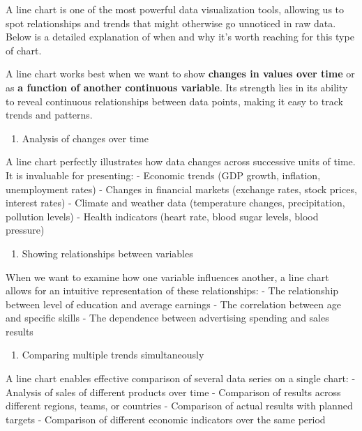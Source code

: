 \documentclass[
  english,
  letterpaper,
  DIV=11,
  numbers=noendperiod]{scrreprt}
\providecommand{\tightlist}{%
  \setlength{\itemsep}{0pt}\setlength{\parskip}{0pt}}
\begin{document}
A line chart is one of the most powerful data visualization tools,
allowing us to spot relationships and trends that might otherwise go
unnoticed in raw data. Below is a detailed explanation of when and why
it's worth reaching for this type of chart.

A line chart works best when we want to show \textbf{changes in values
over time} or as \textbf{a function of another continuous variable}. Its
strength lies in its ability to reveal continuous relationships between
data points, making it easy to track trends and patterns.

\begin{enumerate}
\def\labelenumi{\arabic{enumi}.}
\tightlist
\item
  Analysis of changes over time
\end{enumerate}

A line chart perfectly illustrates how data changes across successive
units of time. It is invaluable for presenting: - Economic trends (GDP
growth, inflation, unemployment rates) - Changes in financial markets
(exchange rates, stock prices, interest rates) - Climate and weather
data (temperature changes, precipitation, pollution levels) - Health
indicators (heart rate, blood sugar levels, blood pressure)

\begin{enumerate}
\def\labelenumi{\arabic{enumi}.}
\setcounter{enumi}{1}
\tightlist
\item
  Showing relationships between variables
\end{enumerate}

When we want to examine how one variable influences another, a line
chart allows for an intuitive representation of these relationships: -
The relationship between level of education and average earnings - The
correlation between age and specific skills - The dependence between
advertising spending and sales results

\begin{enumerate}
\def\labelenumi{\arabic{enumi}.}
\setcounter{enumi}{2}
\tightlist
\item
  Comparing multiple trends simultaneously
\end{enumerate}

A line chart enables effective comparison of several data series on a
single chart: - Analysis of sales of different products over time -
Comparison of results across different regions, teams, or countries -
Comparison of actual results with planned targets - Comparison of
different economic indicators over the same period
\end{document}
